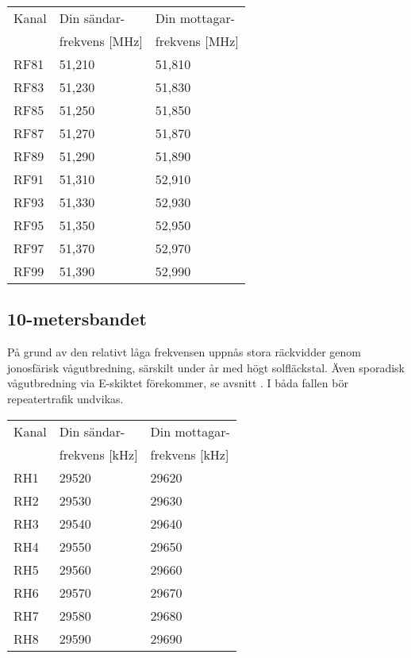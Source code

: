 \bigskip

\begin{tabular}{ l | l | l }
  Kanal & Din sändar- & Din mottagar- \\
        & frekvens [\si{\mega\hertz}] & frekvens [\si{\mega\hertz}] \\
  \hline
  RF81 & 51,210 & 51,810 \\
  RF83 & 51,230 & 51,830 \\
  RF85 & 51,250 & 51,850 \\
  RF87 & 51,270 & 51,870 \\
  RF89 & 51,290 & 51,890 \\
  RF91 & 51,310 & 52,910 \\
  RF93 & 51,330 & 52,930 \\
  RF95 & 51,350 & 52,950 \\
  RF97 & 51,370 & 52,970 \\
  RF99 & 51,390 & 52,990 \\
\end{tabular}



\subsection{10-metersbandet}

På grund av den relativt låga frekvensen uppnås stora räckvidder genom
jonosfärisk vågutbredning, särskilt under år med högt solfläckstal.
Även sporadisk vågutbredning via E-skiktet förekommer, se avsnitt
. I båda fallen bör repeatertrafik undvikas.

\bigskip

\begin{tabular}{ l | l | l }
  Kanal & Din sändar- & Din mottagar- \\
        & frekvens [\si{\kilo\hertz}] & frekvens [\si{\kilo\hertz}] \\
  \hline
  RH1 & 29520 & 29620 \\
  RH2 & 29530 & 29630 \\
  RH3 & 29540 & 29640 \\
  RH4 & 29550 & 29650 \\
  RH5 & 29560 & 29660 \\
  RH6 & 29570 & 29670 \\
  RH7 & 29580 & 29680 \\
  RH8 & 29590 & 29690 \\
\end{tabular}


